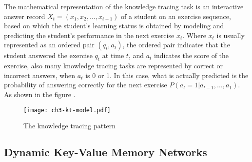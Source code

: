 The mathematical representation of the knowledge tracing task is an interactive answer record \(X_t=(x_1,x_2,\ldots,x_{t-1})\) of a student on an exercise sequence, based on which the student's learning status is obtained by modeling and predicting the student's performance in the next exercise \(x_{t}\). Where \(x_t\) is usually represented as an ordered pair \((q_t,a_t)\), the ordered pair indicates that the student answered the exercise \(q_t\) at time \(t\), and \(a_t\) indicates the score of the exercise, also many knowledge tracing tasks are represented by correct or incorrect answers, when \(a_t\) is 0 or 1. In this case, what is actually predicted is the probability of answering correctly for the next exercise \(P(a_{t}=1|a_{t-1},\ldots,a_1)\). As shown in the figure \figname{\ref{fig:ch3-model-ktdes}}.

\begin{figure}[htbp!]
    \texttt{[image: ch3-kt-model.pdf]}
    \caption{The knowledge tracing pattern}\label{fig:ch3-model-ktdes}
\end{figure}

\subsection{Dynamic Key-Value Memory Networks}


